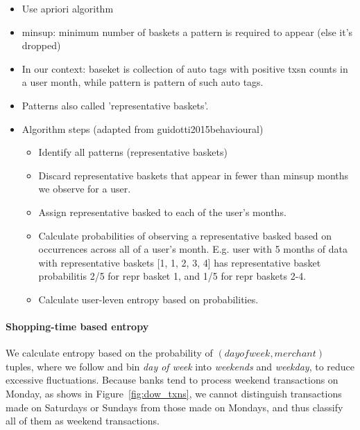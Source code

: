 \begin{itemize}
    \item Use apriori algorithm

    \item minsup: minimum number of baskets a pattern is required to appear
        (else it's dropped)

    \item In our context: baseket is collection of auto tags with positive txsn
        counts in a user month, while pattern is pattern of such auto tags.

    \item Patterns also called 'representative baskets'.

    \item Algorithm steps (adapted from guidotti2015behavioural)

        \begin{itemize}
            \item Identify all patterns (representative baskets)

            \item Discard representative baskets that appear in fewer than
                minsup months we observe for a user. 

            \item Assign representative basked to each of the user's months.

            \item Calculate probabilities of observing a representative basked
                based on occurrences across all of a user's month. E.g. user
                with 5 months of data with representative baskets [1, 1, 2, 3,
                4] has representative basket probabilitis 2/5 for repr basket
                1, and 1/5 for repr baskets 2-4.

            \item Calculate user-leven entropy based on probabilities.
        \end{itemize}
\end{itemize}





\paragraph{Shopping-time based entropy}%
\label{par:shopping_time_based_entropy}

We calculate entropy based on the probability of $(day of week, merchant)$
tuples, where we follow \citet{guidotti2015behavioral} and bin \textit{day of
week} into \textit{weekends} and \textit{weekday}, to reduce excessive
fluctuations. Because banks tend to process weekend transactions on Monday, as shows in
Figure~\ref{fig:dow_txns}, we cannot distinguish transactions made on Saturdays
or Sundays from those made on Mondays, and thus classify all of them as weekend
transactions.

